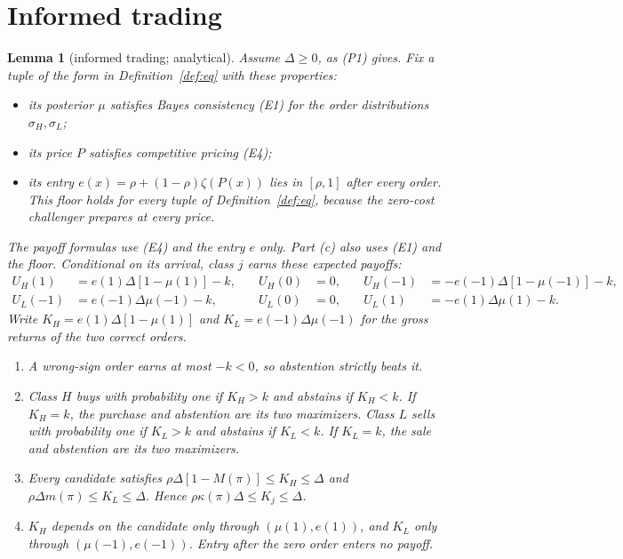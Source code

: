 \documentclass[11pt]{article}
\newtheorem{lemma}{Lemma}
\theoremstyle{definition}
\begin{document}
\section{Informed trading}\label{sec:trading}

\begin{lemma}[informed trading; analytical]\label{lem:trade}
Assume $\Delta\ge0$, as (P1) gives. Fix a tuple of the form in Definition~\ref{def:eq} with these properties:
\begin{itemize}
\item its posterior $\mu$ satisfies Bayes consistency (E1) for the order distributions $\sigma_H,\sigma_L$;
\item its price $P$ satisfies competitive pricing (E4);
\item its entry $e(x)=\rho+(1-\rho)\zeta(P(x))$ lies in $[\rho,1]$ after every order. This floor holds for every
  tuple of Definition~\ref{def:eq}, because the zero-cost challenger prepares at every price.
\end{itemize}
The payoff formulas use (E4) and the entry $e$ only. Part (c) also uses (E1) and the floor.
Conditional on its arrival, class $j$ earns these expected payoffs:
\[
\begin{aligned}
U_H(1)&=e(1)\Delta[1-\mu(1)]-k,&\quad U_H(0)&=0,&\quad U_H(-1)&=-e(-1)\Delta[1-\mu(-1)]-k,\\
U_L(-1)&=e(-1)\Delta\mu(-1)-k,&\quad U_L(0)&=0,&\quad U_L(1)&=-e(1)\Delta\mu(1)-k.
\end{aligned}
\]
Write $K_H=e(1)\Delta[1-\mu(1)]$ and $K_L=e(-1)\Delta\mu(-1)$ for the gross returns of the two correct orders.
\begin{enumerate}[label=(\alph*)]
\item A wrong-sign order earns at most $-k<0$, so abstention strictly beats it.
\item Class $H$ buys with probability one if $K_H>k$ and abstains if $K_H<k$. If $K_H=k$, the purchase and
  abstention are its two maximizers. Class $L$ sells with probability one if $K_L>k$ and abstains if $K_L<k$.
  If $K_L=k$, the sale and abstention are its two maximizers.
\item Every candidate satisfies $\rho\Delta[1-M(\pi)]\le K_H\le\Delta$ and $\rho\Delta m(\pi)\le K_L\le\Delta$.
  Hence $\rho\kappa(\pi)\Delta\le K_j\le\Delta$.
\item $K_H$ depends on the candidate only through $(\mu(1),e(1))$, and $K_L$ only through $(\mu(-1),e(-1))$.
  Entry after the zero order enters no payoff.
\end{enumerate}
\end{lemma}
\end{document}
